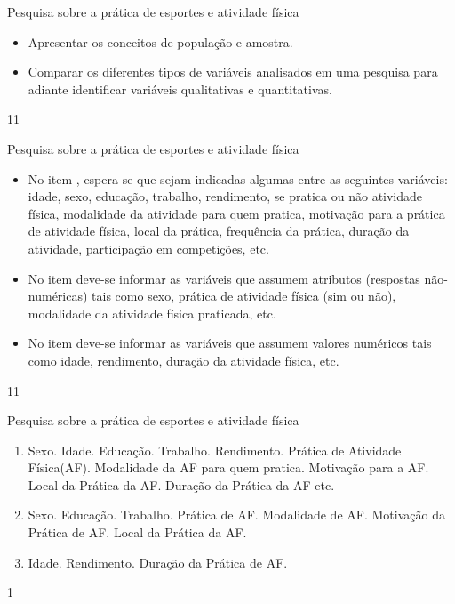 \clearmargin
\begin{objectives}{Pesquisa sobre a prática de esportes e atividade física}
{
\begin{itemize}

\item Apresentar os conceitos de população e amostra.

\item Comparar os diferentes tipos de variáveis analisados em uma pesquisa para adiante identificar variáveis qualitativas e quantitativas.

\end{itemize}
}{1}{1}
\end{objectives}
\begin{sugestions}{Pesquisa sobre a prática de esportes e atividade física}
{
\begin{itemize}
\item No item , espera-se que sejam indicadas algumas entre as seguintes variáveis: idade, sexo, educação, trabalho, rendimento, se pratica ou não atividade física, modalidade da atividade para quem pratica, motivação para a prática de atividade física, local da prática, frequência da prática, duração da atividade, participação em competições, etc.

\item No item  deve-se informar as variáveis que assumem atributos (respostas não-numéricas) tais como sexo, prática de atividade física (sim ou não), modalidade da atividade física praticada, etc.

\item No item  deve-se informar as variáveis que assumem valores numéricos tais como idade, rendimento, duração da atividade física, etc.
\end{itemize}
}{1}{1}
\end{sugestions}
\clearmargin
\begin{answer}{Pesquisa sobre a prática de esportes e atividade física}
{
\begin{enumerate}
\item Sexo. Idade. Educação. Trabalho. Rendimento. Prática de Atividade Física(AF). Modalidade da AF para quem pratica. Motivação para a AF. Local da Prática da AF. Duração da Prática da AF etc.

\item Sexo. Educação. Trabalho. Prática de AF. Modalidade de AF. Motivação da Prática de AF. Local da Prática da AF.

\item Idade. Rendimento. Duração da Prática de AF.
\end{enumerate}
}{1}
\end{answer}

